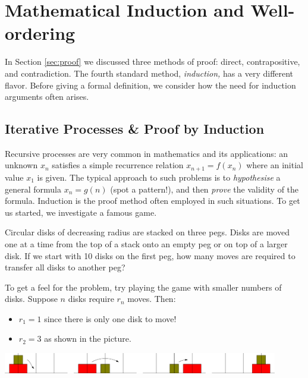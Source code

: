 \graphicspath{{5induction/asy/}}
\section{Mathematical Induction and Well-ordering}\label{chap:induction}

In Section \ref{sec:proof} we discussed three methods of proof: direct, contrapositive, and contradiction. The fourth standard method, \emph{induction,} has a very different flavor. Before giving a formal definition, we consider how the need for induction arguments often arises.

\subsection{Iterative Processes \& Proof by Induction}\label{sec:induction}

Recursive processes are very common in mathematics and its applications: an unknown $x_n$ satisfies a simple recurrence relation $x_{n+1}=f(x_n)$ where an initial value $x_1$ is given. The typical approach to such problems is to \emph{hypothesise} a general formula $x_n=g(n)$ (spot a pattern!), and then \emph{prove} the validity of the formula. Induction is the proof method often employed in such situations. To get us started, we investigate a famous game.



Circular disks of decreasing radius are stacked on three pegs. Disks are moved one at a time from the top of a stack onto an empty peg or on top of a larger disk. If we start with 10 disks on the first peg, how many moves are required to transfer all disks to another peg?\smallbreak

To get a feel for the problem, try playing the game with smaller numbers of disks. Suppose $n$ disks require $r_n$ moves. Then:
\begin{itemize}\itemsep0pt
  \item $r_1=1$ since there is only one disk to move!
  \item $r_2=3$ as shown in the picture.
\end{itemize} 

\begin{center}
	\includegraphics[width=0.9\textwidth]{induction-03-hanoi2}
\end{center}

